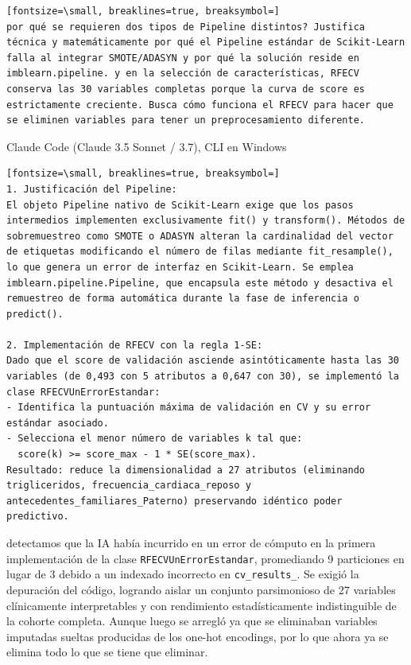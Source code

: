 \documentclass[12pt,a4paper,oneside]{book}
\begin{document}
\begin{iaprompt}
\begin{Verbatim}[fontsize=\small, breaklines=true, breaksymbol=]
por qué se requieren dos tipos de Pipeline distintos? Justifica técnica y matemáticamente por qué el Pipeline estándar de Scikit-Learn falla al integrar SMOTE/ADASYN y por qué la solución reside en imblearn.pipeline. y en la selección de características, RFECV conserva las 30 variables completas porque la curva de score es estrictamente creciente. Busca cómo funciona el RFECV para hacer que se eliminen variables para tener un preprocesamiento diferente.
\end{Verbatim}
\end{iaprompt}
\begin{iaresp}{Claude Code (Claude 3.5 Sonnet / 3.7), CLI en Windows}
\begin{Verbatim}[fontsize=\small, breaklines=true, breaksymbol=]
1. Justificación del Pipeline:
El objeto Pipeline nativo de Scikit-Learn exige que los pasos intermedios implementen exclusivamente fit() y transform(). Métodos de sobremuestreo como SMOTE o ADASYN alteran la cardinalidad del vector de etiquetas modificando el número de filas mediante fit_resample(), lo que genera un error de interfaz en Scikit-Learn. Se emplea imblearn.pipeline.Pipeline, que encapsula este método y desactiva el remuestreo de forma automática durante la fase de inferencia o predict().

2. Implementación de RFECV con la regla 1-SE:
Dado que el score de validación asciende asintóticamente hasta las 30 variables (de 0,493 con 5 atributos a 0,647 con 30), se implementó la clase RFECVUnErrorEstandar:
- Identifica la puntuación máxima de validación en CV y su error estándar asociado.
- Selecciona el menor número de variables k tal que:
  score(k) >= score_max - 1 * SE(score_max).
Resultado: reduce la dimensionalidad a 27 atributos (eliminando trigliceridos, frecuencia_cardiaca_reposo y antecedentes_familiares_Paterno) preservando idéntico poder predictivo.
\end{Verbatim}
\end{iaresp}
\begin{iaanalisis}
detectamos que la IA había incurrido en un error de cómputo en la primera implementación de la clase \texttt{RFECVUnErrorEstandar}, promediando 9 particiones en lugar de 3 debido a un indexado incorrecto en \texttt{cv\_results\_}. Se exigió la depuración del código, logrando aislar un conjunto parsimonioso de 27 variables clínicamente interpretables y con rendimiento estadísticamente indistinguible de la cohorte completa. Aunque luego se arregló ya que se eliminaban variables imputadas sueltas producidas de los one-hot encodings, por lo que ahora ya se elimina todo lo que se tiene que eliminar.
\end{iaanalisis}
\end{document}
